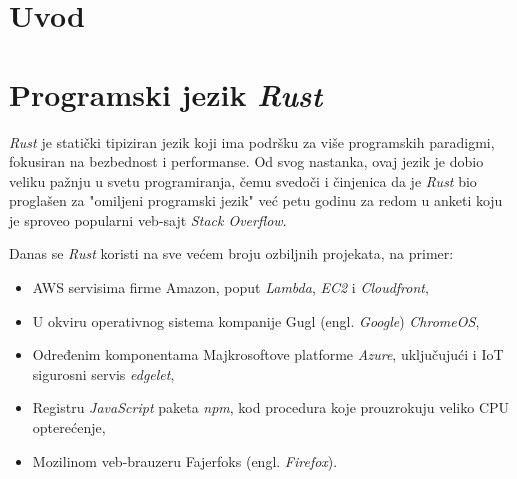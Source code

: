 \documentclass[12pt,oneside]{memoir}
\begin{document}
\frontmatter
\naslovna
\komisija
\apstrakt
\tableofcontents*

\mainmatter

\chapter{Uvod}
\chapter{Programski jezik \emph{Rust}}
\emph{Rust} je statički tipiziran jezik koji ima podršku za više programskih 
paradigmi, fokusiran na bezbednost i performanse. Od svog nastanka, ovaj jezik
je dobio veliku pažnju u svetu programiranja, čemu svedoči i činjenica da je 
\emph{Rust} bio proglašen za "omiljeni programski jezik" već petu godinu za redom 
u anketi koju je sproveo popularni veb-sajt \emph{Stack Overflow}.

Danas se \emph{Rust} koristi na sve većem broju ozbiljnih projekata, na primer:

\begin{itemize}
    \item AWS servisima firme Amazon, poput \emph{Lambda}, \emph{EC2}
        i \emph{Cloudfront},
    \item U okviru operativnog sistema kompanije Gugl (engl. \emph{Google}) 
        \emph{ChromeOS},
    \item Određenim komponentama Majkrosoftove platforme \emph{Azure}, uključujući i 
        IoT sigurosni servis \emph{edgelet},
    \item Registru \emph{JavaScript} paketa \emph{npm}, 
        kod procedura koje prouzrokuju veliko CPU opterećenje,
    \item Mozilinom veb-brauzeru Fajerfoks (engl. \emph{Firefox}).
\end{itemize}
\end{document}
